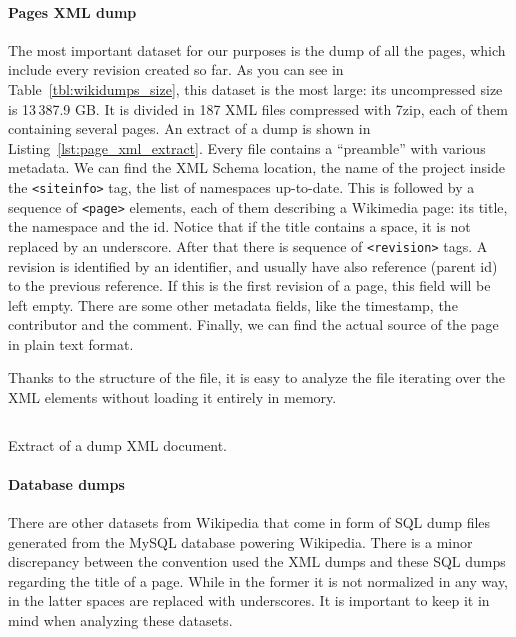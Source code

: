 \paragraph{Pages XML dump}
The most important dataset for our purposes is the dump of all the pages, which include every revision created so far.
As you can see in Table~\ref{tbl:wikidumps_size}, this dataset is the most large: its uncompressed size is 13\,387.9 GB\@.
It is divided in 187 XML files compressed with 7zip, each of them containing several pages.
An extract of a dump is shown in Listing~\ref{lst:page_xml_extract}.
Every file contains a ``preamble'' with various metadata.
We can find the XML Schema location, the name of the project inside the \texttt{<siteinfo>} tag, the list of namespaces up-to-date.
This is followed by a sequence of \texttt{<page>} elements, each of them describing a Wikimedia page: its title, the namespace and the id.
Notice that if the title contains a space, it is not replaced by an underscore.
After that there is sequence of \texttt{<revision>} tags.
A revision is identified by an identifier, and usually have also reference (parent id) to the previous reference.
If this is the first revision of a page, this field will be left empty.
There are some other metadata fields, like the timestamp, the contributor and the comment.
Finally, we can find the actual source of the page in plain text format.

Thanks to the structure of the file, it is easy to analyze the file iterating over the XML elements without loading it entirely in memory.

\begin{listing}[]
    \inputminted[breaklines=true]{xml}{assets/page_xml_extract.xml}
    \caption{Extract of a dump XML document.}
    \label{lst:page_xml_extract}
\end{listing}

\paragraph{Database dumps}
There are other datasets from Wikipedia that come in form of SQL dump files generated from the MySQL database powering Wikipedia.
There is a minor discrepancy between the convention used the XML dumps and these SQL dumps regarding the title of a page.
While in the former it is not normalized in any way, in the latter spaces are replaced with underscores.
It is important to keep it in mind when analyzing these datasets.

